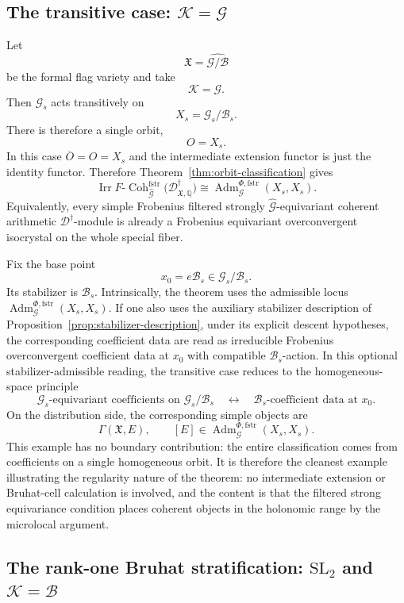 \documentclass[11pt]{amsart}
\theoremstyle{plain}
\theoremstyle{definition}
\theoremstyle{remark}
\newcommand{\fstr}{\mathrm{fstr}}
\newcommand{\Adm}{\operatorname{Adm}}
\begin{document}
\subsection{The transitive case: \texorpdfstring{\(\mathcal K=\mathcal G\)}{K=G}}

Let
\[
  \mathfrak X=\widehat{\mathcal G/\mathcal B}
\]
be the formal flag variety and take
\[
  \mathcal K=\mathcal G.
\]
Then \(\mathcal G_s\) acts transitively on
\[
  X_s=\mathcal G_s/\mathcal B_s.
\]
There is therefore a single orbit,
\[
  O=X_s.
\]
In this case \(\overline O=O=X_s\) and the intermediate extension functor is
just the identity functor. Therefore Theorem~\ref{thm:orbit-classification}
gives
\[
  \operatorname{Irr}
  F\text{-}\operatorname{Coh}^{\fstr}_{\widehat{\mathcal G}}
  \bigl(\mathscr D^\dagger_{\mathfrak X,\mathbb Q}\bigr)
  \cong
  \Adm^{\Phi,\fstr}_{\mathcal G}(X_s,X_s).
\]
Equivalently, every simple Frobenius filtered strongly \(\widehat{\mathcal G}\)-equivariant
coherent arithmetic \(\mathscr D^\dagger\)-module is already a Frobenius equivariant
overconvergent isocrystal on the whole special fiber.

Fix the base point
\[
  x_0=e\mathcal B_s\in \mathcal G_s/\mathcal B_s.
\]
Its stabilizer is \(\mathcal B_s\).  Intrinsically, the theorem uses the
admissible locus \(\Adm^{\Phi,\fstr}_{\mathcal G}(X_s,X_s)\).  If one also
uses the auxiliary stabilizer description of
Proposition~\ref{prop:stabilizer-description}, under its explicit descent
hypotheses, the corresponding coefficient data are read as irreducible
Frobenius overconvergent coefficient data at \(x_0\) with compatible
\(\mathcal B_s\)-action.  In this optional stabilizer-admissible reading, the transitive case reduces to the homogeneous-space principle
\[
  \mathcal G_s\text{-equivariant coefficients on }\mathcal G_s/\mathcal B_s
  \quad\leftrightarrow\quad
  \mathcal B_s\text{-coefficient data at }x_0.
\]
On the distribution side, the corresponding simple objects are
\[
  \Gamma(\mathfrak X,E),
  \qquad
  [E]\in \Adm^{\Phi,\fstr}_{\mathcal G}(X_s,X_s).
\]
This example has no boundary contribution: the entire classification comes
from coefficients on a single homogeneous orbit.  It is therefore the cleanest
example illustrating the regularity nature of the theorem: no intermediate
extension or Bruhat-cell calculation is involved, and the content is that the
filtered strong equivariance condition places coherent objects in the holonomic
range by the microlocal argument.

\subsection{The rank-one Bruhat stratification: \texorpdfstring{\(\mathrm{SL}_2\)}{SL2} and \texorpdfstring{\(\mathcal K=\mathcal B\)}{K=B}}
\end{document}
